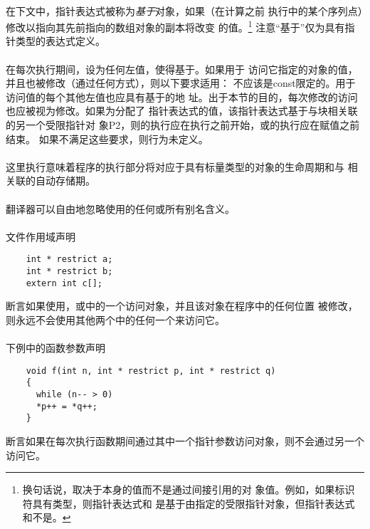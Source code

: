 {\paragraph{}
在下文中，指针表达式被称为\textit{基于}对象，如果（在计算之前
执行中的某个序列点）修改以指向其先前指向的数组对象的副本将改变
的值。\footnote{换句话说，取决于本身的值而不是通过间接引用的对
象值。例如，如果标识符具有类型，则指针表达式和
是基于由指定的受限指针对象，但指针表达式和不是。}
注意``基于''仅为具有指针类型的表达式定义。

\paragraph{}
在每次执行期间，设为任何左值，使得基于。如果用于
访问它指定的对象的值，并且也被修改（通过任何方式），则以下要求适用：
不应该是const限定的。用于访问值的每个其他左值也应具有基于的地
址。出于本节的目的，每次修改的访问也应被视为修改。如果为分配了
指针表达式的值，该指针表达式基于与块相关联的另一个受限指针对
象{P2}，则的执行应在执行之前开始，或的执行应在赋值之前结束。
如果不满足这些要求，则行为未定义。

\paragraph{}
这里执行意味着程序的执行部分将对应于具有标量类型的对象的生命周期和与
相关联的自动存储期。

\paragraph{}
翻译器可以自由地忽略使用的任何或所有别名含义。

\paragraph{}
\ex 文件作用域声明
\begin{lstlisting}
    int * restrict a;
    int * restrict b;
    extern int c[];
\end{lstlisting}
断言如果使用，或中的一个访问对象，并且该对象在程序中的任何位置
被修改，则永远不会使用其他两个中的任何一个来访问它。

\paragraph{}
\ex 下例中的函数参数声明
\begin{lstlisting}
    void f(int n, int * restrict p, int * restrict q)
    {
      while (n-- > 0)
      *p++ = *q++;
    }
\end{lstlisting}
断言如果在每次执行函数期间通过其中一个指针参数访问对象，则不会通过另一个访问它。

}
